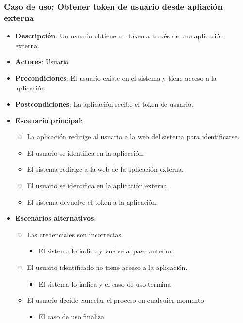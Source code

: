 \documentclass[12pt,a4paperpaper,]{report}
\providecommand{\tightlist}{%
  \setlength{\itemsep}{0pt}\setlength{\parskip}{0pt}}
\begin{document}
\subsubsection{Caso de uso: Obtener token de usuario desde apliación
externa}\label{caso-de-uso-obtener-token-de-usuario-desde-apliaciuxf3n-externa}

\begin{itemize}
\tightlist
\item
  \textbf{Descripción}: Un usuario obtiene un token a través de una
  aplicación externa.
\item
  \textbf{Actores}: Usuario
\item
  \textbf{Precondiciones}: El usuario existe en el sistema y tiene
  acceso a la aplicación.
\item
  \textbf{Postcondiciones}: La aplicación recibe el token de usuario.
\item
  \textbf{Escenario principal}:

  \begin{itemize}
  \tightlist
  \item
    La aplicación redirige al usuario a la web del sistema para
    identificarse.
  \item
    El usuario se identifica en la aplicación.
  \item
    El sistema redirige a la web de la aplicación externa.
  \item
    El usuario se identifica en la aplicación externa.
  \item
    El sistema devuelve el token a la aplicación.
  \end{itemize}
\item
  \textbf{Escenarios alternativos}:

  \begin{itemize}
  \tightlist
  \item
    Las credenciales son incorrectas.

    \begin{itemize}
    \tightlist
    \item
      El sistema lo indica y vuelve al paso anterior.
    \end{itemize}
  \item
    El usuario identificado no tiene acceso a la aplicación.

    \begin{itemize}
    \tightlist
    \item
      El sistema lo indica y el caso de uso termina
    \end{itemize}
  \item
    El usuario decide cancelar el proceso en cualquier momento

    \begin{itemize}
    \tightlist
    \item
      El caso de uso finaliza
    \end{itemize}
  \end{itemize}
\end{itemize}
\end{document}
